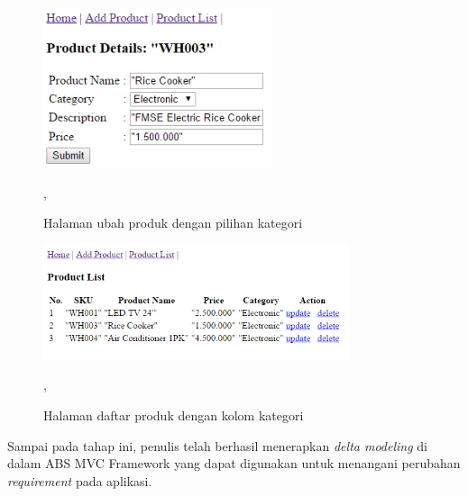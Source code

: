 \begin{figure}
    \centering
    \includegraphics[width=0.6\textwidth]{img/update-product-withCategory}
    \caption{Halaman ubah produk dengan pilihan kategori},
    \label{fig:updateProductWithCategory}
\end{figure}

\begin{figure}
    \centering
    \includegraphics[width=0.8\textwidth]{img/list-product-withCategory}
    \caption{Halaman daftar produk dengan kolom kategori},
    \label{fig:deleteProductWithCategory}
\end{figure}

Sampai pada tahap ini, penulis telah berhasil menerapkan \textit{delta modeling} di dalam ABS MVC Framework yang dapat digunakan untuk menangani perubahan \textit{requirement} pada aplikasi.